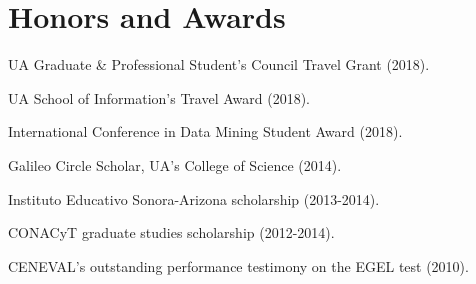\documentclass[letterpaper]{article}
\renewenvironment{itemize}{
  \begin{list}{}{
    \setlength{\leftmargin}{1.5em}
  }
}{
  \end{list}
}
\begin{document}
\section*{Honors and Awards}
\begin{itemize}
	\item UA Graduate \& Professional Student's Council Travel Grant (2018).
	\item UA School of Information's Travel Award (2018).
	\item International Conference in Data Mining Student Award (2018).
	\item Galileo Circle Scholar, UA's College of Science (2014).
	\item Instituto Educativo Sonora-Arizona scholarship (2013-2014).
	\item CONACyT graduate studies scholarship (2012-2014).
	\item CENEVAL's outstanding performance testimony on the EGEL test (2010). 
\end{itemize}
\end{document}

